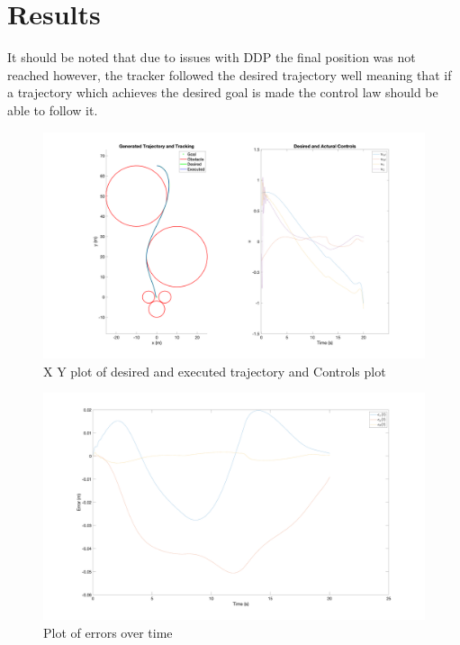 \documentclass[letterpaper, 12pt]{article}
\begin{document}
\section{Results}
It should be noted that due to issues with DDP the final position was not reached however, the tracker followed the desired trajectory well meaning that if a trajectory which achieves the desired goal is made the control law should be able to follow it.
\begin{figure}
    \centering
    \includegraphics[width=\textwidth]{./figures/plot_and_controls.png}
    \caption{X Y plot of desired and executed trajectory and Controls plot}
    \label{fig:my_label}
\end{figure}

\begin{figure}[t]
    \centering
    \includegraphics[width=\textwidth]{./figures/Error.png}
    \caption{Plot of errors over time}
    \label{fig:my_label}
\end{figure}
\end{document}

